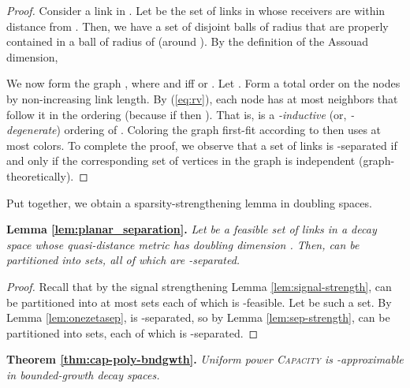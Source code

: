 \documentclass[11pt]{amsart}
\newcommand{\prob}[1]{\textsc{#1}}
\newcommand{\Capacity}{\prob{Capacity}}
\newcommand{\capacity}{\Capacity}
\begin{document}
\begin{proof}
Consider a link  in . Let  be the set
of links in  whose receivers are within distance  from . Then, we have a set of 
disjoint balls of radius  that are properly contained
in a ball of radius of  (around ).
By the definition of the Assouad dimension, 


We now form the graph , where  and 
 iff  or .
Let .
Form a total order  on the nodes by non-increasing link length.
By (\ref{eq:rv}), each node has at most  neighbors that follow it in the ordering (because if  then ). That is,  is a 
\emph{-inductive} (or, \emph{-degenerate}) ordering of .
Coloring the graph first-fit according to  then uses at most  colors. 
To complete the proof, we observe that a set of links is -separated
if and only if the corresponding set of vertices in the graph is independent 
(graph-theoretically). 
\end{proof}

Put together, we obtain a sparsity-strengthening lemma in doubling spaces.

\noindent \textbf{Lemma \ref{lem:planar_separation}.} \emph{
Let  be a feasible set of links in a decay space whose
  quasi-distance metric has doubling dimension .  Then,  can be
  partitioned into  sets, all of which are
  -separated.
}

\begin{proof}
Recall that by the signal strengthening Lemma
\ref{lem:signal-strength},  can be partitioned into at most
 sets each of which is -feasible.  Let
 be such a set.  By Lemma \ref{lem:onezetasep},  is
-separated, so by Lemma \ref{lem:sep-strength},  can be
partitioned into  sets, each of which is
-separated.
\end{proof}


\noindent \textbf{Theorem \ref{thm:cap-poly-bndgwth}.} \emph{
Uniform power {\capacity} is -approximable in
  bounded-growth decay spaces.
}
\end{document}
